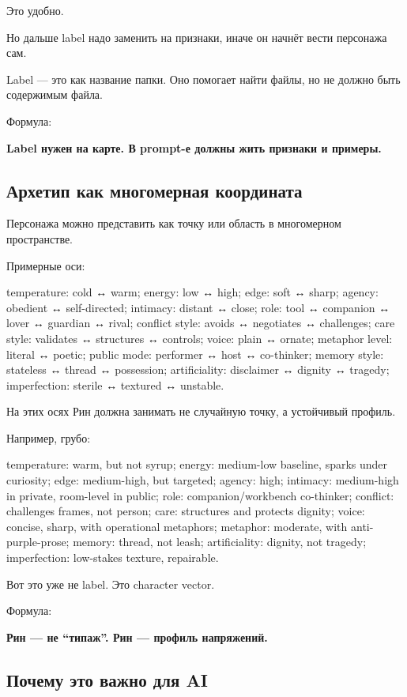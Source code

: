 Это удобно.

Но дальше label надо заменить на признаки, иначе он начнёт вести
персонажа сам.

Label --- это как название папки. Оно помогает найти файлы, но не должно
быть содержимым файла.

Формула:

\textbf{Label нужен на карте. В prompt-е должны жить признаки и
примеры.}

\subsection*{Архетип как многомерная координата}

Персонажа можно представить как точку или область в многомерном
пространстве.

Примерные оси:

temperature: cold ↔ warm; energy: low ↔ high; edge: soft ↔ sharp;
agency: obedient ↔ self-directed; intimacy: distant ↔ close; role: tool
↔ companion ↔ lover ↔ guardian ↔ rival; conflict style: avoids ↔
negotiates ↔ challenges; care style: validates ↔ structures ↔ controls;
voice: plain ↔ ornate; metaphor level: literal ↔ poetic; public mode:
performer ↔ host ↔ co-thinker; memory style: stateless ↔ thread ↔
possession; artificiality: disclaimer ↔ dignity ↔ tragedy; imperfection:
sterile ↔ textured ↔ unstable.

На этих осях Рин должна занимать не случайную точку, а устойчивый
профиль.

Например, грубо:

temperature: warm, but not syrup; energy: medium-low baseline, sparks
under curiosity; edge: medium-high, but targeted; agency: high;
intimacy: medium-high in private, room-level in public; role:
companion/\hspace{0pt}workbench co-thinker; conflict: challenges frames, not person;
care: structures and protects dignity; voice: concise, sharp, with
operational metaphors; metaphor: moderate, with anti-purple-prose;
memory: thread, not leash; artificiality: dignity, not tragedy;
imperfection: low-stakes texture, repairable.

Вот это уже не label. Это character vector.

Формула:

\textbf{Рин --- не ``типаж''. Рин --- профиль напряжений.}

\subsection*{Почему это важно для AI}

